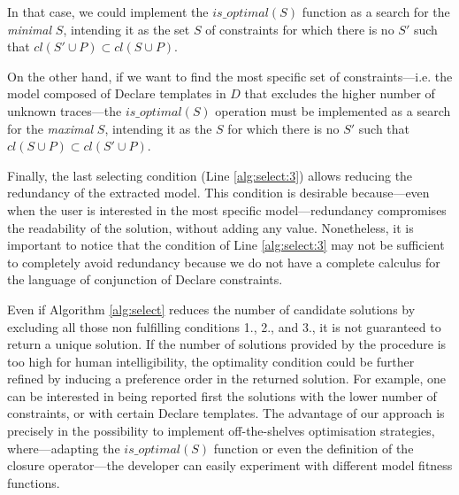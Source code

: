 %
In that case, we could implement the $is\_optimal(S)$ function as a search for the \emph{minimal} $S$, intending it as the set $S$ of constraints for which there is no $S'$ such that ${cl}(S' \cup P) \subset {cl}(S \cup P)$.

On the other hand, if we want to find the most specific set of constraints---i.e. the model composed of Declare templates in $D$ that excludes the higher number of unknown traces---the $is\_optimal(S)$ operation must be implemented as a search for the \emph{maximal} $S$, intending it as the $S$ for which there is no $S'$ such that ${cl}(S \cup P) \subset {cl}(S' \cup P)$.

Finally, the last selecting condition (Line \ref{alg:select:3}) allows reducing the redundancy of the extracted model. This condition is desirable because---even when the user is interested in the most specific model---redundancy compromises the readability of the solution, without adding any value. Nonetheless, it is important to notice that the condition of Line \ref{alg:select:3} may not be sufficient to completely avoid redundancy because we do not have a complete calculus for the language of conjunction of Declare constraints.



Even if Algorithm \ref{alg:select} reduces the number of candidate solutions by excluding all those non fulfilling conditions 1., 2., and 3., it is not guaranteed to return a unique solution. If the number of solutions provided by the procedure is too high for human intelligibility, the optimality condition could be further refined by inducing a preference order in the returned solution. For example, one can be interested in being reported first the solutions with the lower number of constraints, or with certain Declare templates. The advantage of our approach is precisely in the possibility to implement off-the-shelves optimisation strategies, where---adapting the $is\_optimal(S)$ function or even the definition of the closure operator---the developer can easily experiment with different model fitness functions.

